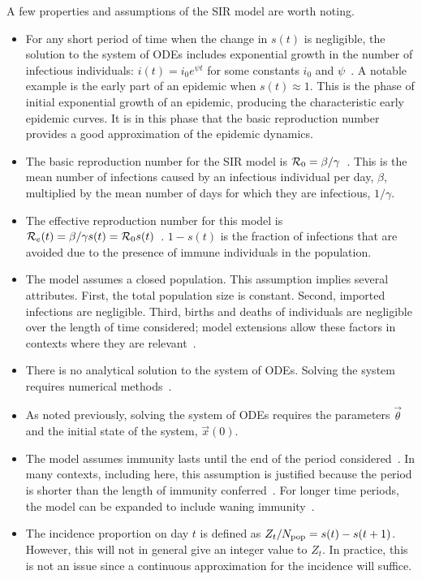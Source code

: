 \documentclass[thesis.tex]{subfiles}
\begin{document}

A few properties and assumptions of the SIR model are worth noting.
\begin{itemize}
    \item For any short period of time when the change in $s(t)$ is negligible, the solution to the system of ODEs includes exponential growth in the number of infectious individuals: $i(t) = i_0 e^{\psi t}$ for some constants $i_0$ and $\psi$~\autocite[section 1.2]{diekmannMathematical}.
    A notable example is the early part of an epidemic when $s(t) \approx 1$.
    This is the phase of initial exponential growth of an epidemic, producing the characteristic early epidemic curves.
    It is in this phase that the basic reproduction number provides a good approximation of the epidemic dynamics.
    \item The basic reproduction number for the SIR model is $\mathcal{R}_{0} = \beta / \gamma$~\autocite[20]{keelingModeling}.
    This is the mean number of infections caused by an infectious individual per day, $\beta$, multiplied by the mean number of days for which they are infectious, $1/\gamma$.
    \item The effective reproduction number for this model is $\mathcal{R}_{e}(t) = \beta / \gamma s(t) = \mathcal{R}_{0} s(t)$~\autocite{pellisEstimation}.
    $1-s(t)$ is the fraction of infections that are avoided due to the presence of immune individuals in the population.
    \item The model assumes a closed population.
    This assumption implies several attributes.
    First, the total population size is constant.
    Second, imported infections are negligible. 
    Third, births and deaths of individuals are negligible over the length of time considered; model extensions allow these factors in contexts where they are relevant~\autocites[26]{keelingModeling}[214]{kretzschmarMathematical}.
    \item There is no analytical solution to the system of ODEs.
      Solving the system requires numerical methods~\autocite[25]{keelingModeling}.
    \item As noted previously, solving the system of ODEs requires the parameters $\vec{\theta}$ and the initial state of the system, $\vec{x}(0)$.
    \item The model assumes immunity lasts until the end of the period considered~\autocite[61]{andersonInfectious}.
    In many contexts, including here, this assumption is justified because the period is shorter than the length of immunity conferred~\autocite{milneImmunity}.
    For longer time periods, the model can be expanded to include waning immunity~\autocite[40]{keelingModeling}.
    \item The incidence proportion on day $t$ is defined as $Z_t / N_\text{pop} = s(t) - s(t+1)$. However, this will not in general give an integer value to $Z_t$. In practice, this is not an issue since a continuous approximation for the incidence will suffice.
\end{itemize}
\end{document}
